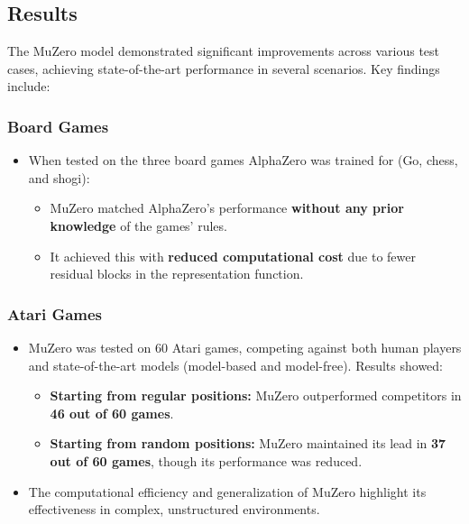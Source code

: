 \subsection*{Results}
The MuZero model demonstrated significant improvements across various test cases, achieving state-of-the-art performance in several scenarios. Key findings include:

\subsubsection*{Board Games}
\begin{itemize}
    \item When tested on the three board games AlphaZero was trained for (Go, chess, and shogi):
    \begin{itemize}
        \item MuZero matched AlphaZero's performance \textbf{without any prior knowledge} of the games' rules.
        \item It achieved this with \textbf{reduced computational cost} due to fewer residual blocks in the representation function.
    \end{itemize}
\end{itemize}

\subsubsection*{Atari Games}
\begin{itemize}
    \item MuZero was tested on 60 Atari games, competing against both human players and state-of-the-art models (model-based and model-free). Results showed:
    \begin{itemize}
        \item \textbf{Starting from regular positions:} MuZero outperformed competitors in \textbf{46 out of 60 games}.
        \item \textbf{Starting from random positions:} MuZero maintained its lead in \textbf{37 out of 60 games}, though its performance was reduced.
    \end{itemize}
    \item The computational efficiency and generalization of MuZero highlight its effectiveness in complex, unstructured environments.
\end{itemize}

